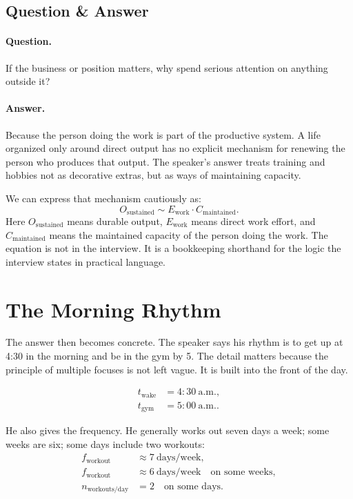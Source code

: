 \subsection{Question \& Answer}

\paragraph{Question.}
If the business or position matters, why spend serious attention on anything outside it?

\paragraph{Answer.}
Because the person doing the work is part of the productive system. A life organized only around direct output has no explicit mechanism for renewing the person who produces that output. The speaker's answer treats training and hobbies not as decorative extras, but as ways of maintaining capacity.

We can express that mechanism cautiously as:
\begin{equation}
O_{\mathrm{sustained}}
\sim
E_{\mathrm{work}}\cdot C_{\mathrm{maintained}}.
\end{equation}
Here \(O_{\mathrm{sustained}}\) means durable output, \(E_{\mathrm{work}}\) means direct work effort, and \(C_{\mathrm{maintained}}\) means the maintained capacity of the person doing the work. The equation is not in the interview. It is a bookkeeping shorthand for the logic the interview states in practical language.

\section{The Morning Rhythm}

The answer then becomes concrete. The speaker says his rhythm is to get up at 4:30 in the morning and be in the gym by 5. The detail matters because the principle of multiple focuses is not left vague. It is built into the front of the day.

\begin{align}
t_{\mathrm{wake}} &= 4{:}30\ \mathrm{a.m.},\\
t_{\mathrm{gym}}  &= 5{:}00\ \mathrm{a.m.}.
\end{align}

He also gives the frequency. He generally works out seven days a week; some weeks are six; some days include two workouts:
\begin{align}
f_{\mathrm{workout}} &\approx 7\ \text{days/week},\\
f_{\mathrm{workout}} &\approx 6\ \text{days/week}\quad \text{on some weeks},\\
n_{\mathrm{workouts/day}} &= 2\quad \text{on some days}.
\end{align}

